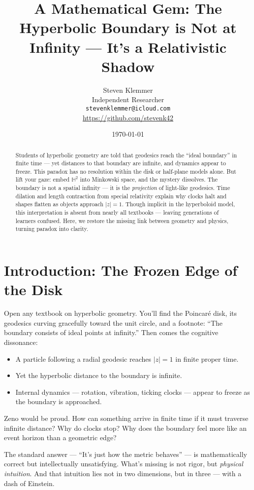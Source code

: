 \documentclass[10pt]{article}
\title{A Mathematical Gem: The Hyperbolic Boundary is Not at Infinity --- It's a Relativistic Shadow}
\author{Steven Klemmer\\
\small Independent Researcher\\
\small \texttt{stevenklemmer@icloud.com}\\
\small \url{https://github.com/stevenk42}}
\date{\today}
\begin{document}
\maketitle

\begin{abstract}
Students of hyperbolic geometry are told that geodesics reach the ``ideal boundary'' in finite time --- yet distances to that boundary are infinite, and dynamics appear to freeze. This paradox has no resolution within the disk or half-plane models alone. But lift your gaze: embed $\mathbb{H}^2$ into Minkowski space, and the mystery dissolves. The boundary is not a spatial infinity --- it is the \emph{projection} of light-like geodesics. Time dilation and length contraction from special relativity explain why clocks halt and shapes flatten as objects approach $|z|=1$. Though implicit in the hyperboloid model, this interpretation is absent from nearly all textbooks --- leaving generations of learners confused. Here, we restore the missing link between geometry and physics, turning paradox into clarity.
\end{abstract}

\section*{Introduction: The Frozen Edge of the Disk}

Open any textbook on hyperbolic geometry. You'll find the Poincaré disk, its geodesics curving gracefully toward the unit circle, and a footnote: ``The boundary consists of ideal points at infinity.'' Then comes the cognitive dissonance:

\begin{itemize}
    \item A particle following a radial geodesic reaches $|z| = 1$ in finite proper time.
    \item Yet the hyperbolic distance to the boundary is infinite.
    \item Internal dynamics --- rotation, vibration, ticking clocks --- appear to freeze as the boundary is approached.
\end{itemize}

Zeno would be proud. How can something arrive in finite time if it must traverse infinite distance? Why do clocks stop? Why does the boundary feel more like an event horizon than a geometric edge?

The standard answer --- ``It's just how the metric behaves'' --- is mathematically correct but intellectually unsatisfying. What's missing is not rigor, but \emph{physical intuition}. And that intuition lies not in two dimensions, but in three --- with a dash of Einstein.
\end{document}
